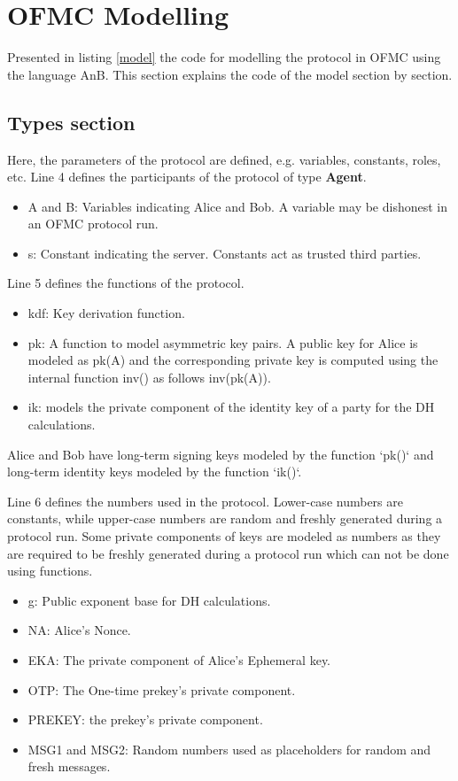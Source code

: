 \section{OFMC Modelling}
Presented in listing \ref{model} the code for modelling the protocol in OFMC using the language AnB. This section explains the code of the model section by section.


\subsection{Types section} 
Here, the parameters of the protocol are defined, e.g. variables, constants, roles, etc. Line 4 defines the participants of the protocol of type \textbf{Agent}.
\begin{itemize}\setlength\itemsep{-0.3em}
	\item A and B: Variables indicating Alice and Bob. A variable may be dishonest in an OFMC protocol run.
	\item s: Constant indicating the server. Constants act as trusted third parties.
\end{itemize}
\par
Line 5 defines the functions of the protocol.
\begin{itemize}\setlength\itemsep{-0.3em}
	\item kdf: Key derivation function.
	\item pk: A function to model asymmetric key pairs. A public key for Alice is modeled as pk(A) and the corresponding private key is computed using the internal function inv() as follows inv(pk(A)).
	\item ik: models the private component of the identity key of a party for the DH calculations.
\end{itemize}
	Alice and Bob have long-term signing keys modeled by the function `pk()` and long-term identity keys modeled by the function `ik()`.
	\par
Line 6 defines the numbers used in the protocol. Lower-case numbers are constants, while upper-case numbers are random and freshly generated during a protocol run. Some private components of keys are modeled as numbers as they are required to be freshly generated during a protocol run which can not be done using functions.
\begin{itemize}\setlength\itemsep{-0.3em}
	\item g: Public exponent base for DH calculations.
	\item NA: Alice's Nonce.
	\item EKA: The private component of Alice's Ephemeral key.
	\item OTP: The One-time prekey's private component.
	\item PREKEY: the prekey's private component.
	\item MSG1 and MSG2: Random numbers used as placeholders for random and fresh messages.
\end{itemize}

